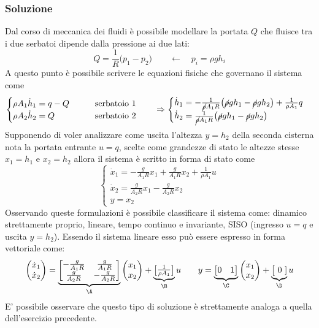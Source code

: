 		
	\subsubsection{Soluzione}
		Dal corso di meccanica dei fluidi è possibile modellare la portata $Q$ che fluisce tra i due serbatoi dipende dalla pressione ai due lati:
		\[ Q = \frac 1 R \big(p_1 - p_2\big) \qquad \leftarrow \quad p_i =\rho g h_i \]
		A questo punto è possibile scrivere le equazioni fisiche che governano il sistema come
		\[ \begin{cases}
			\rho A_1 \dot h_1 = q- Q \qquad & \textrm{serbatoio 1}  \\
			\rho A_2 \dot h_2 = Q & \textrm{serbatoio 2}
		\end{cases} \qquad \Rightarrow \begin{cases}
			\dot h_1 = -\frac 1 {\cancel{\rho} A_1R} \big(\cancel\rho g h_1 - \cancel\rho g h_2 \big) + \frac{1}{\rho A_1} q \\
			\dot h_2 = \frac 1 {\cancel{\rho} A_1R} \big(\cancel\rho g h_1 - \cancel\rho g h_2 \big)
	\end{cases} \]
		Supponendo di voler analizzare come uscita l'altezza $y=h_2$ della seconda cisterna nota la portata entrante $u=q$, scelte come grandezze di stato le altezze stesse $x_1=h_1$ e $x_2 = h_2$ allora il sistema è scritto in forma di stato come
		\[ \begin{cases}
			\dot x_1 = - \frac g {A_1R} x_1 + \frac g {A_1R} x_2 + \frac 1 {\rho A_1} u \\
			\dot x_2 = \frac g {A_2R} x_1 - \frac g {A_2R} x_2 \\ y = x_2
		\end{cases} \]
		Osservando queste formulazioni è possibile classificare il sistema come: dinamico strettamente proprio, lineare, tempo continuo e invariante, SISO (ingresso $u=q$ e uscita $y = h_2$). Essendo il sistema lineare esso può essere espresso in forma vettoriale come:
		\[ \begin{pmatrix}
			\dot x_1 \\ \dot x_2
		\end{pmatrix} = \underbrace{\begin{bmatrix}
				-\frac g {A_1R} & \frac g {A_1R} \\
				\frac g {A_2R} & -\frac g {A_2R} \\
		\end{bmatrix}}_\A \begin{pmatrix}
			x_1 \\ x_2
		\end{pmatrix} + \underbrace{\begin{bmatrix}
				\frac 1 {\rho A_1}
		\end{bmatrix} }_\B u  \qquad y = \underbrace{\begin{bmatrix}
				0 & 1 
		\end{bmatrix}}_\C \begin{pmatrix}
			x_1 \\ x_2
		\end{pmatrix} + \underbrace{\big[\ 0 \ ]}_\D u\]
		E' possibile osservare che questo tipo di soluzione è strettamente analoga a quella dell'esercizio precedente.
		
